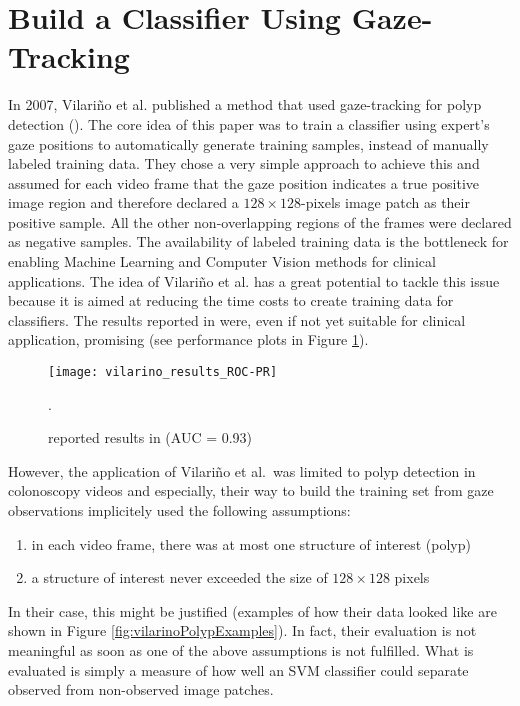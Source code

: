 \section{Build a Classifier Using Gaze-Tracking}
In 2007, Vilari\~no et al. published a method that used gaze-tracking for polyp detection (\cite{vilarino2007automatic}). 
The core idea of this paper was to train a classifier using expert's gaze positions to automatically generate training samples, instead of manually labeled training data. 
They chose a very simple approach to achieve this and assumed for each video frame that the gaze position indicates a true positive image region and therefore declared a $128\times128$-pixels image patch as their positive sample. All the other non-overlapping regions of the frames were declared as negative samples.
The availability of labeled training data is the bottleneck for enabling Machine Learning and Computer Vision methods for clinical applications. 
The idea of Vilari\~no et al. has a great potential to tackle this issue because it is aimed at reducing the time costs to create training data for classifiers. 
The results reported in \cite{vilarino2007automatic} were, even if not yet suitable for clinical application, promising (see performance plots in Figure \ref{fig:vilarino-results}).
\begin{figure}[ht]
	\centering
	\texttt{[image: vilarino\_results\_ROC-PR]}
	\caption{reported results in \cite{vilarino2007automatic} (AUC = 0.93)}.
	\label{fig:vilarino-results}
\end{figure}

However, the application of Vilari\~no et al.\ was limited to polyp detection in colonoscopy videos and especially, their way to build the training set from gaze observations implicitely used the following assumptions:
\begin{enumerate}
 \item in each video frame, there was at most one structure of interest (polyp)
 \item a structure of interest never exceeded the size of $128 \times 128$ pixels
\end{enumerate}
In their case, this might be justified (examples of how their data looked like are shown in Figure \ref{fig:vilarinoPolypExamples}). 
In fact, their evaluation is not meaningful as soon as one of the above assumptions is not fulfilled. What is evaluated is simply a measure of how well an SVM classifier could separate observed from non-observed image patches. 

